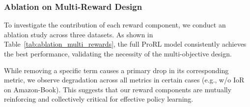 \subsubsection{Ablation on Multi-Reward Design}
\label{sec:ablation_multi_rewards}
To investigate the contribution of each reward component, we conduct an ablation study across three datasets. As shown in Table~\ref{tab:ablation_multi_rewards}, the full ProRL model consistently achieves the best performance, validating the necessity of the multi-objective design.

While removing a specific term causes a primary drop in its corresponding metric, we observe degradation across all metrics in certain cases (e.g., w/o IoR on Amazon-Book). This suggests that our reward components are mutually reinforcing and collectively critical for effective policy learning.

\begin{table}[t!]
  \centering
  \caption{Ablation study on the multi-reward design}
  \label{tab:ablation_multi_rewards}
\end{table}


